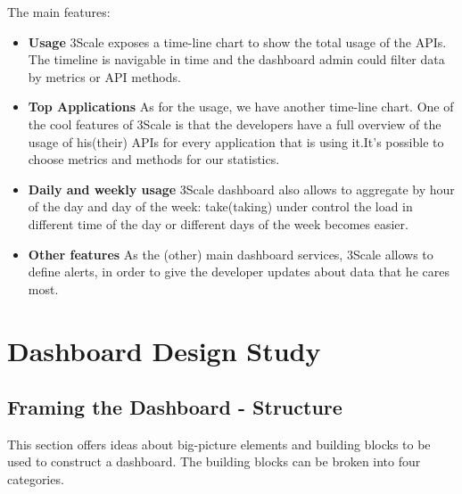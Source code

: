 \documentclass[a4paper,13pt]{report}
\begin{document}
The main features:
\begin{itemize}
\item \textbf{Usage}\newline
 3Scale exposes a time-line chart to show the total usage of the APIs. The timeline is navigable in time and the dashboard admin could filter data by  metrics or API methods.

\item  \textbf{Top Applications}\newline
As for the usage, we have  another time-line chart. One of the cool features of 3Scale is that the developers have a full overview of the usage of his(their) APIs for every application that is using it.It's possible to choose metrics and methods for our statistics.

\item \textbf{Daily and weekly usage}\newline
 3Scale dashboard also allows to aggregate by hour of the day and day of the week: take(taking) under control the load in different time of the day or different days of the week becomes easier.


\item \textbf{Other features}\newline
As the (other) main dashboard services, 3Scale allows to define alerts, in order to give the developer updates about data that he cares most.
\end{itemize}

\chapter{Dashboard Design Study}
\section{Framing the Dashboard - Structure}
This section offers ideas about big-picture elements and building blocks to be used to construct a dashboard. \newline The building blocks can be broken into four categories.
\end{document}
